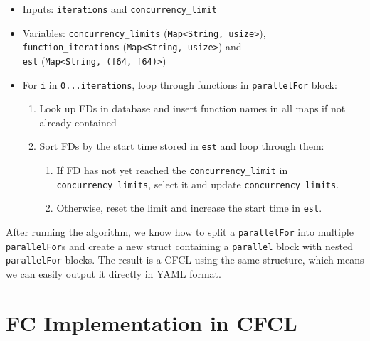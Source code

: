 \begin{itemize}
  \item Inputs: \texttt{iterations} and \texttt{concurrency\_limit}
  \item Variables: \texttt{concurrency\_limits} (\texttt{Map<String, usize>}), \\ \texttt{function\_iterations} (\texttt{Map<String, usize>}) and \\ \texttt{est} (\texttt{Map<String, (f64, f64)>})
  \item For \texttt{i} in \texttt{0...iterations}, loop through functions in \texttt{parallelFor} block:
    \begin{enumerate}
      \item Look up FDs in database and insert function names in all maps if not already contained
      \item Sort FDs by the start time stored in \texttt{est} and loop through them:
        \begin{enumerate}
          \item If FD has not yet reached the \texttt{concurrency\_limit} in \texttt{concurrency\_limits}, select it and update \texttt{concurrency\_limits}.
          \item Otherwise, reset the limit and increase the start time in \texttt{est}.
        \end{enumerate}
  \end{enumerate}
\end{itemize}

After running the algorithm, we know how to split a \texttt{parallelFor} into multiple \texttt{parallelFor}s and
create a new struct containing a \texttt{parallel} block with nested \texttt{parallelFor} blocks. The result is a
CFCL using the same structure, which means we can easily output it directly in YAML format.



%
%
%
\section{FC Implementation in CFCL}

